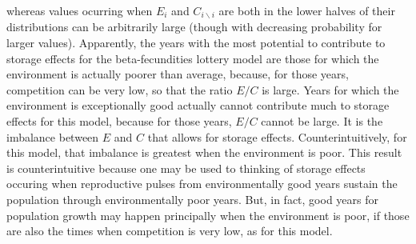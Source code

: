 \documentclass[letterpaper,11pt]{article}
\newcommand{\bs}{\backslash}
\begin{document}
whereas values ocurring when $E_i$ and $C_{i \bs i}$ are both in the lower
halves of their distributions can be arbitrarily large (though with decreasing 
probability for larger values). Apparently, the years with the most potential to 
contribute to storage
effects for the beta-fecundities lottery model are those for which the environment
is actually poorer than average, because, for those years, competition can be very low,
so that the ratio $E/C$ is large. Years for which the
environment is exceptionally good actually cannot contribute much to storage effects for 
this model, because for those years, $E/C$ cannot be large.
It is the imbalance between $E$ and $C$ that allows for storage effects. 
Counterintuitively, for this model, that imbalance is greatest when the environment is 
poor. This result is counterintuitive because one may be used to thinking of storage effects
occuring when reproductive pulses from environmentally good years sustain the population
through environmentally poor years. But, in fact, good years for population growth may
happen principally when the environment is poor, if those are also the times when 
competition is very low, as for this model.
\end{document}
